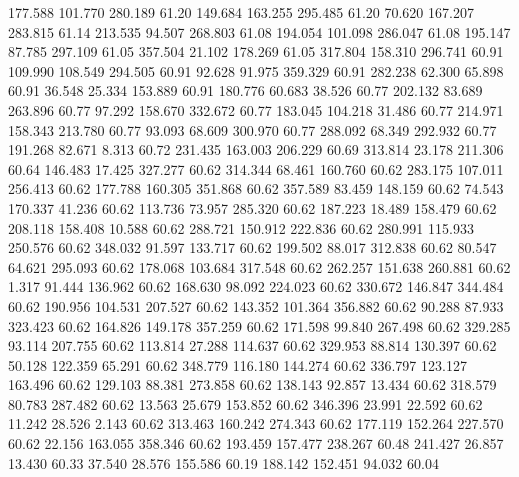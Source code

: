  177.588  101.770  280.189        61.20
 149.684  163.255  295.485        61.20
  70.620  167.207  283.815        61.14
 213.535   94.507  268.803        61.08
 194.054  101.098  286.047        61.08
 195.147   87.785  297.109        61.05
 357.504   21.102  178.269        61.05
 317.804  158.310  296.741        60.91
 109.990  108.549  294.505        60.91
  92.628   91.975  359.329        60.91
 282.238   62.300   65.898        60.91
  36.548   25.334  153.889        60.91
 180.776   60.683   38.526        60.77
 202.132   83.689  263.896        60.77
  97.292  158.670  332.672        60.77
 183.045  104.218   31.486        60.77
 214.971  158.343  213.780        60.77
  93.093   68.609  300.970        60.77
 288.092   68.349  292.932        60.77
 191.268   82.671    8.313        60.72
 231.435  163.003  206.229        60.69
 313.814   23.178  211.306        60.64
 146.483   17.425  327.277        60.62
 314.344   68.461  160.760        60.62
 283.175  107.011  256.413        60.62
 177.788  160.305  351.868        60.62
 357.589   83.459  148.159        60.62
  74.543  170.337   41.236        60.62
 113.736   73.957  285.320        60.62
 187.223   18.489  158.479        60.62
 208.118  158.408   10.588        60.62
 288.721  150.912  222.836        60.62
 280.991  115.933  250.576        60.62
 348.032   91.597  133.717        60.62
 199.502   88.017  312.838        60.62
  80.547   64.621  295.093        60.62
 178.068  103.684  317.548        60.62
 262.257  151.638  260.881        60.62
   1.317   91.444  136.962        60.62
 168.630   98.092  224.023        60.62
 330.672  146.847  344.484        60.62
 190.956  104.531  207.527        60.62
 143.352  101.364  356.882        60.62
  90.288   87.933  323.423        60.62
 164.826  149.178  357.259        60.62
 171.598   99.840  267.498        60.62
 329.285   93.114  207.755        60.62
 113.814   27.288  114.637        60.62
 329.953   88.814  130.397        60.62
  50.128  122.359   65.291        60.62
 348.779  116.180  144.274        60.62
 336.797  123.127  163.496        60.62
 129.103   88.381  273.858        60.62
 138.143   92.857   13.434        60.62
 318.579   80.783  287.482        60.62
  13.563   25.679  153.852        60.62
 346.396   23.991   22.592        60.62
  11.242   28.526    2.143        60.62
 313.463  160.242  274.343        60.62
 177.119  152.264  227.570        60.62
  22.156  163.055  358.346        60.62
 193.459  157.477  238.267        60.48
 241.427   26.857   13.430        60.33
  37.540   28.576  155.586        60.19
 188.142  152.451   94.032        60.04

